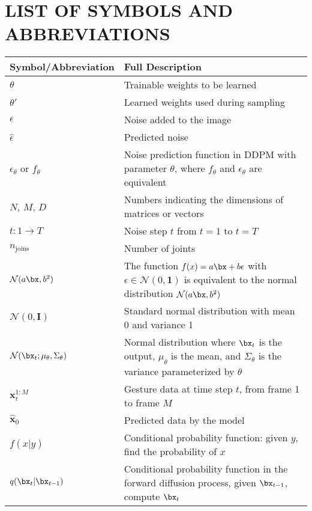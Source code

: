 \pagebreak
{}
{}
\section*{\textbf{ \Large LIST OF SYMBOLS AND ABBREVIATIONS}}

\begin{center}
\begin{tabular}{|p{3cm}|p{11cm}|}
\hline
\textbf{Symbol/Abbreviation} & \textbf{Full Description} \\
\hline
$\theta$ & Trainable weights to be learned \\
\hline
$\theta'$ & Learned weights used during sampling \\
\hline
$\epsilon$ & Noise added to the image \\
\hline
$\hat{\epsilon}$ & Predicted noise \\
\hline
$\epsilon_\theta$ or $f_\theta$ & Noise prediction function in DDPM with parameter $\theta$, where $f_\theta$ and $\epsilon_\theta$ are equivalent \\
\hline
$N$, $M$, $D$ & Numbers indicating the dimensions of matrices or vectors \\
\hline
$t: 1 \rightarrow T$ & Noise step $t$ from $t=1$ to $t=T$ \\
\hline
$n_{\operatorname{joins}}$ & Number of joints \\
\hline
$\mathcal{N}(a \bx, b^2)$ & The function $f(x) = a \bx + b \epsilon$ with $\epsilon \in \mathcal{N}(0, \mathbf{1})$ is equivalent to the normal distribution $\mathcal{N}(a \bx, b^2)$ \\
\hline
$\mathcal{N}(0, \mathbf{I})$ & Standard normal distribution with mean 0 and variance 1 \\
\hline
$\mathcal{N}(\bx_t; \mu_\theta, \Sigma_\theta)$ & Normal distribution where $\bx_t$ is the output, $\mu_\theta$ is the mean, and $\Sigma_\theta$ is the variance parameterized by $\theta$ \\
\hline
$\mathbf{x}_{t}^{1:M}$ & Gesture data at time step $t$, from frame 1 to frame $M$ \\
\hline
$\hat{\mathbf{x}}_0$ & Predicted data by the model \\
\hline
$f(x | y)$ & Conditional probability function: given $y$, find the probability of $x$ \\
\hline
$q(\bx_t | \bx_{t-1})$ & Conditional probability function in the forward diffusion process, given $\bx_{t-1}$, compute $\bx_t$ \\

\end{tabular}
\end{center}
